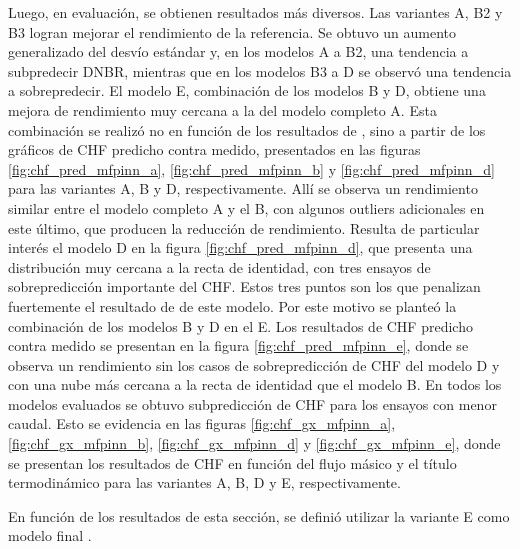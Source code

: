 Luego, en evaluación, se obtienen resultados más diversos. Las variantes A, B2 y B3 logran mejorar el rendimiento de la referencia. Se obtuvo un aumento generalizado del desvío estándar y, en los modelos A a B2, una tendencia a subpredecir DNBR, mientras que en los modelos B3 a D se observó una tendencia a sobrepredecir. El modelo E, combinación de los modelos B y D, obtiene una mejora de rendimiento muy cercana a la del modelo completo A. Esta combinación se realizó no en función de los resultados de \dnbrmin{}, sino a partir de los gráficos de CHF predicho contra medido, presentados en las figuras \ref{fig:chf_pred_mfpinn_a}, \ref{fig:chf_pred_mfpinn_b} y \ref{fig:chf_pred_mfpinn_d} para las variantes A, B y D, respectivamente. 
Allí se observa un rendimiento similar entre el modelo completo A y el B, con algunos outliers adicionales en este último, que producen la reducción de rendimiento. Resulta de particular interés el modelo D en la figura \ref{fig:chf_pred_mfpinn_d}, que presenta una distribución muy cercana a la recta de identidad, con tres ensayos de sobrepredicción importante del CHF. Estos tres puntos son los que penalizan fuertemente el resultado de \dnbrmin{} de este modelo. Por este motivo se planteó la combinación de los modelos B y D en el E. Los resultados de CHF predicho contra medido se presentan en la figura \ref{fig:chf_pred_mfpinn_e}, donde se observa un rendimiento sin los casos de sobrepredicción de CHF del modelo D y con una nube más cercana a la recta de identidad que el modelo B. En todos los modelos evaluados se obtuvo subpredicción de CHF para los ensayos con menor caudal. Esto se evidencia en las figuras \ref{fig:chf_gx_mfpinn_a}, \ref{fig:chf_gx_mfpinn_b}, \ref{fig:chf_gx_mfpinn_d} y \ref{fig:chf_gx_mfpinn_e}, donde se presentan los resultados de CHF en función del flujo másico y el título termodinámico para las variantes A, B, D y E, respectivamente.

En función de los resultados de esta sección, se definió utilizar la variante E como modelo final \mfpinn{}.

